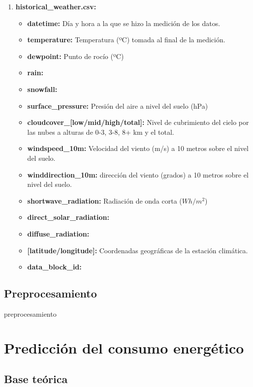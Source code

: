 \documentclass[a4paper,12pt]{article}
\begin{document}
\begin{enumerate}
    \item \textbf{historical\_weather.csv:}
    \begin{itemize}
        \item \textbf{datetime:} Día y hora a la que se hizo la 
        medición de los datos.
        \item \textbf{temperature:} Temperatura 
        (ºC) tomada al final de la medición.
        \item \textbf{dewpoint:} Punto de rocío (ºC)
        \item \textbf{rain:}
        \item \textbf{snowfall:}
        \item \textbf{surface\_pressure:} Presión del aire a 
        nivel del suelo (hPa)
        \item \textbf{cloudcover\_[low/mid/high/total]:}
        Nivel de cubrimiento del cielo por las nubes a
        alturas de 0-3, 3-8, 8+ km y el total. 
        \item \textbf{windspeed\_10m:} Velocidad del viento (m/s) 
        a 10 metros sobre el nivel del suelo.
        \item \textbf{winddirection\_10m:} dirección del viento
        (grados) a 10 metros sobre el nivel del suelo.
        \item \textbf{shortwave\_radiation:} Radiación de onda 
        corta ($Wh/m^{2}$)
        \item \textbf{direct\_solar\_radiation:}
        \item \textbf{diffuse\_radiation:}
        \item \textbf{[latitude/longitude]:} Coordenadas geográficas
        de la estación climática.
        \item \textbf{data\_block\_id:}
    \end{itemize}

\end{enumerate}

\subsection{Preprocesamiento}
preprocesamiento

\section{Predicción del consumo energético}

\subsection{Base teórica}
\end{document}
